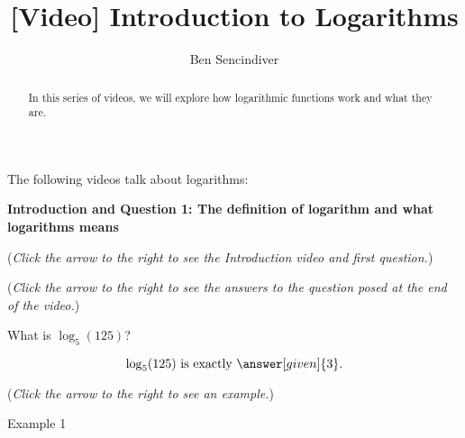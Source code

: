 \documentclass{ximera}
\title[Prerequisite Videos:]{[Video] Introduction to Logarithms}
\author{Ben Sencindiver}
\begin{document}
\begin{abstract}
  In this series of videos, we will explore how logarithmic functions
  work and what they are.
\end{abstract}
\maketitle

The following videos talk about logarithms: 

\textbf{Introduction and Question 1: The definition of logarithm and what
logarithms means}
\begin{question}
\begin{flushright}
{\color{blue}(\emph{Click the arrow to the right to see the Introduction video and first question.})}
\end{flushright}
\begin{center}
\begin{expandable}
{\color{blue}(\emph{Click the arrow to the right to see the answers 
to the question posed at the end of the video.})}
\begin{expandable}
What is $\log_5(125)$?
\begin{prompt}
\[
\log_5(125) \text{ is exactly }\answer[given]{3}.
\]
\end{prompt}
\begin{flushright}
{\color{blue}(\emph{Click the arrow to the right to see an example.})}
\end{flushright}
\begin{expandable}
Example 1
\end{expandable}
\end{expandable}
\end{expandable}
\end{center}
\end{question}
\end{document}
